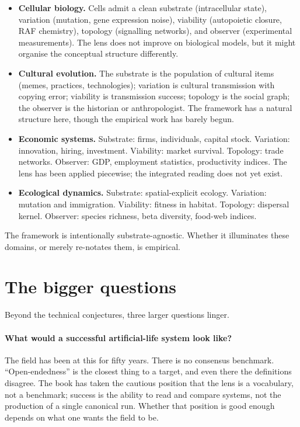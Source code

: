 \begin{itemize}[leftmargin=1.5em,itemsep=2pt]
  \item \textbf{Cellular biology.} Cells admit a clean substrate
    (intracellular state), variation (mutation, gene expression
    noise), viability (autopoietic closure, RAF chemistry), topology
    (signalling networks), and observer (experimental measurements).
    The lens does not improve on biological models, but it might
    organise the conceptual structure differently.
  \item \textbf{Cultural evolution.} The substrate is the population
    of cultural items (memes, practices, technologies); variation is
    cultural transmission with copying error; viability is
    transmission success; topology is the social graph; the observer
    is the historian or anthropologist. The framework has a natural
    structure here, though the empirical work has barely begun.
  \item \textbf{Economic systems.} Substrate: firms, individuals,
    capital stock. Variation: innovation, hiring, investment.
    Viability: market survival. Topology: trade networks. Observer:
    GDP, employment statistics, productivity indices. The lens has
    been applied piecewise; the integrated reading does not yet
    exist.
  \item \textbf{Ecological dynamics.} Substrate: spatial-explicit
    ecology. Variation: mutation and immigration. Viability: fitness
    in habitat. Topology: dispersal kernel. Observer: species
    richness, beta diversity, food-web indices.
\end{itemize}

The framework is intentionally substrate-agnostic. Whether it
illuminates these domains, or merely re-notates them, is empirical.

\section{The bigger questions}

Beyond the technical conjectures, three larger questions linger.

\paragraph{What would a successful artificial-life system look like?}
The field has been at this for fifty years. There is no consensus
benchmark. ``Open-endedness'' is the closest thing to a target, and
even there the definitions disagree. The book has taken the cautious
position that the lens is a vocabulary, not a benchmark; success is
the ability to read and compare systems, not the production of a
single canonical run. Whether that position is good enough depends on
what one wants the field to be.

